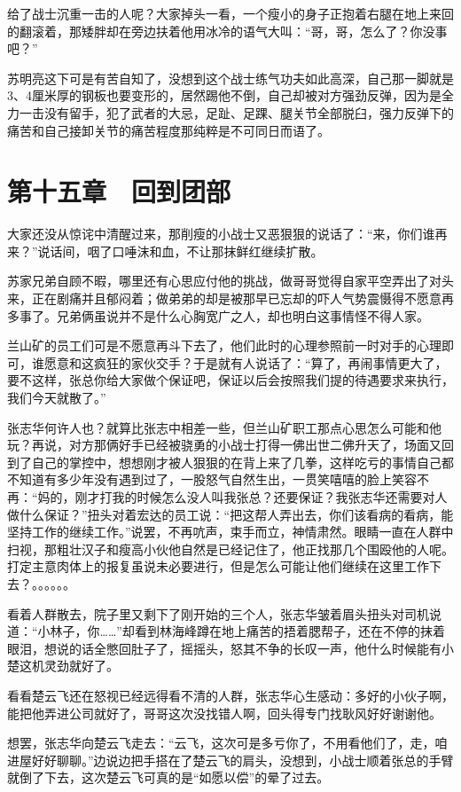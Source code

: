 给了战士沉重一击的人呢？大家掉头一看，一个瘦小的身子正抱着右腿在地上来回的翻滚着，那矮胖却在旁边扶着他用冰冷的语气大叫：“哥，哥，怎么了？你没事吧？”

苏明亮这下可是有苦自知了，没想到这个战士练气功夫如此高深，自己那一脚就是3、4厘米厚的钢板也要变形的，居然踢他不倒，自己却被对方强劲反弹，因为是全力一击没有留手，犯了武者的大忌，足趾、足踝、腿关节全部脱臼，强力反弹下的痛苦和自己接卸关节的痛苦程度那纯粹是不可同日而语了。

\section{第十五章　回到团部}

大家还没从惊诧中清醒过来，那削瘦的小战士又恶狠狠的说话了：“来，你们谁再来？”说话间，咽了口唾沫和血，不让那抹鲜红继续扩散。

苏家兄弟自顾不暇，哪里还有心思应付他的挑战，做哥哥觉得自家平空弄出了对头来，正在剧痛并且郁闷着；做弟弟的却是被那早已忘却的吓人气势震慑得不愿意再多事了。兄弟俩虽说并不是什么心胸宽广之人，却也明白这事情怪不得人家。

兰山矿的员工们可是不愿意再斗下去了，他们此时的心理参照前一时对手的心理即可，谁愿意和这疯狂的家伙交手？于是就有人说话了：“算了，再闹事情更大了，要不这样，张总你给大家做个保证吧，保证以后会按照我们提的待遇要求来执行，我们今天就散了。”

张志华何许人也？就算比张志中相差一些，但兰山矿职工那点心思怎么可能和他玩？再说，对方那俩好手已经被骁勇的小战士打得一佛出世二佛升天了，场面又回到了自己的掌控中，想想刚才被人狠狠的在背上来了几拳，这样吃亏的事情自己都不知道有多少年没有遇到过了，一股怒气自然生出，一贯笑嘻嘻的脸上笑容不再：“妈的，刚才打我的时候怎么没人叫我张总？还要保证？我张志华还需要对人做什么保证？”扭头对着宏达的员工说：“把这帮人弄出去，你们该看病的看病，能坚持工作的继续工作。”说罢，不再吭声，束手而立，神情肃然。眼睛一直在人群中扫视，那粗壮汉子和瘦高小伙他自然是已经记住了，他正找那几个围殴他的人呢。打定主意肉体上的报复虽说未必要进行，但是怎么可能让他们继续在这里工作下去？。。。。。。

看着人群散去，院子里又剩下了刚开始的三个人，张志华皱着眉头扭头对司机说道：“小林子，你……”却看到林海峰蹲在地上痛苦的捂着腮帮子，还在不停的抹着眼泪，想说的话全憋回肚子了，摇摇头，怒其不争的长叹一声，他什么时候能有小楚这机灵劲就好了。

看看楚云飞还在怒视已经远得看不清的人群，张志华心生感动：多好的小伙子啊，能把他弄进公司就好了，哥哥这次没找错人啊，回头得专门找耿风好好谢谢他。

想罢，张志华向楚云飞走去：“云飞，这次可是多亏你了，不用看他们了，走，咱进屋好好聊聊。”边说边把手搭在了楚云飞的肩头，没想到，小战士顺着张总的手臂就倒了下去，这次楚云飞可真的是“如愿以偿”的晕了过去。

